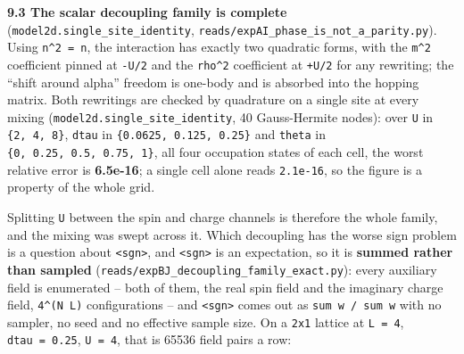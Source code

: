 \documentclass[10pt,letterpaper,twocolumn]{article}
\begin{document}
\textbf{9.3 The scalar decoupling family is complete} (\texttt{model2d.\allowbreak{}single\_\allowbreak{}site\_\allowbreak{}identity},
\texttt{reads/\allowbreak{}expAI\_\allowbreak{}phase\_\allowbreak{}is\_\allowbreak{}not\_\allowbreak{}a\_\allowbreak{}parity.\allowbreak{}py}). Using \texttt{n\^{}2\ =\allowbreak{}\ n}, the interaction has exactly two
quadratic forms, with the \texttt{m\^{}2} coefficient pinned at \texttt{-{}\allowbreak{}U/\allowbreak{}2} and the \texttt{rho\^{}2} coefficient at \texttt{+\allowbreak{}U/\allowbreak{}2}
for any rewriting; the ``shift around alpha'' freedom is one-body and is absorbed into the hopping
matrix. Both rewritings are checked by quadrature on a single site at every mixing
(\texttt{model2d.\allowbreak{}single\_\allowbreak{}site\_\allowbreak{}identity}, 40 Gauss-Hermite nodes): over \texttt{U} in \texttt{\{2,\allowbreak{}\ 4,\allowbreak{}\ 8\}}, \texttt{dtau} in
\texttt{\{0.\allowbreak{}0625,\allowbreak{}\ 0.\allowbreak{}125,\allowbreak{}\ 0.\allowbreak{}25\}} and \texttt{theta} in \texttt{\{0,\allowbreak{}\ 0.\allowbreak{}25,\allowbreak{}\ 0.\allowbreak{}5,\allowbreak{}\ 0.\allowbreak{}75,\allowbreak{}\ 1\}}, all four occupation states of
each cell, the worst relative error is \textbf{6.5e-16}; a single cell alone reads \texttt{2.\allowbreak{}1e-{}\allowbreak{}16}, so the
figure is a property of the whole grid.

Splitting \texttt{U} between the spin and charge channels is therefore the whole family, and the mixing
was swept across it. Which decoupling has the worse sign problem is a question about \texttt{\textless{}\allowbreak{}sgn\textgreater{}\allowbreak{}}, and
\texttt{\textless{}\allowbreak{}sgn\textgreater{}\allowbreak{}} is an expectation, so it is \textbf{summed rather than sampled}
(\texttt{reads/\allowbreak{}expBJ\_\allowbreak{}decoupling\_\allowbreak{}family\_\allowbreak{}exact.\allowbreak{}py}): every auxiliary field is enumerated -- both of them, the
real spin field and the imaginary charge field, \texttt{4\^{}(\allowbreak{}N\ L)\allowbreak{}} configurations -- and \texttt{\textless{}\allowbreak{}sgn\textgreater{}\allowbreak{}} comes out as
\texttt{\textbar{}\allowbreak{}sum\ w\textbar{}\allowbreak{}\ /\allowbreak{}\ sum\ \textbar{}\allowbreak{}w\textbar{}\allowbreak{}} with no sampler, no seed and no effective sample size. On a \texttt{2x1} lattice at
\texttt{L\ =\allowbreak{}\ 4}, \texttt{dtau\ =\allowbreak{}\ 0.\allowbreak{}25}, \texttt{U\ =\allowbreak{}\ 4}, that is 65536 field pairs a row:
\end{document}
